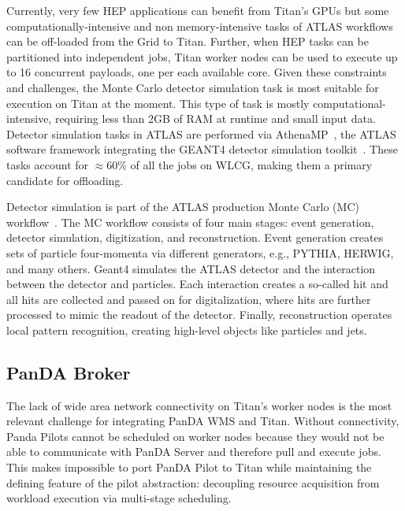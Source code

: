 Currently, very few HEP applications can benefit from Titan's GPUs but some
computationally-intensive and non memory-intensive tasks of ATLAS workflows
can be off-loaded from the Grid to Titan. Further, when HEP tasks can be
partitioned into independent jobs, Titan worker nodes can be used to execute
up to 16 concurrent payloads, one per each available core. Given these
constraints and challenges, the  Monte Carlo detector simulation task is most
suitable for execution on Titan at the moment. This type of task is mostly
computational-intensive, requiring less than 2GB of RAM at runtime and small
input data. Detector simulation tasks in ATLAS are performed via
AthenaMP~\cite{aad2010atlas}, the ATLAS software framework integrating the
GEANT4 detector simulation toolkit~\cite{agostinelli2003geant4}. These tasks
account for \(\approx\)60\% of all the jobs on WLCG, making them a primary
candidate for offloading.

Detector simulation is part of the ATLAS production Monte Carlo (MC)
workflow~\cite{rimoldi2006atlas}. The MC workflow consists of four main
stages: event generation, detector simulation, digitization, and
reconstruction. Event generation creates sets of particle four-momenta via
different generators, e.g., PYTHIA, HERWIG, and many others. Geant4 simulates
the ATLAS detector and the interaction between the detector and particles.
Each interaction creates a so-called hit and all hits are collected and
passed on for digitalization, where hits are further processed to mimic the
readout of the detector. Finally, reconstruction operates local pattern
recognition, creating high-level objects like particles and jets.

\subsection{PanDA Broker}\label{ssec:panda_titan}

The lack of wide area network connectivity on Titan's worker nodes is the
most relevant challenge for integrating PanDA WMS and Titan. Without
connectivity, Panda Pilots cannot be scheduled on worker nodes because they
would not be able to communicate with PanDA Server and therefore pull and
execute jobs. This makes impossible to port PanDA Pilot to Titan while
maintaining the defining feature of the pilot abstraction: decoupling
resource acquisition from workload execution via multi-stage scheduling.

